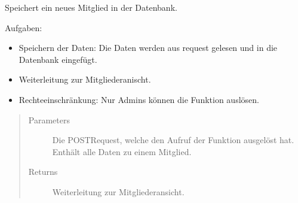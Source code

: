 \documentclass[letterpaper,10pt,english]{sphinxmanual}
\begin{document}
\begin{fulllineitems}
\label{\detokenize{masterCodeDoc:mitglieder.views.erstellen}}
Speichert ein neues Mitglied in der Datenbank.

Aufgaben:
\begin{itemize}
\item {} 
Speichern der Daten: Die Daten werden aus request gelesen und in die Datenbank eingefügt.

\item {} 
Weiterleitung zur Mitgliederanischt.

\item {} 
Rechteeinschränkung: Nur Admins können die Funktion auslösen.

\end{itemize}
\begin{quote}\begin{description}
\item[{Parameters}] \leavevmode
{} \textendash{} Die POST\sphinxhyphen{}Request, welche den Aufruf der Funktion ausgelöst hat. Enthält alle Daten zu einem Mitglied.

\item[{Returns}] \leavevmode
Weiterleitung zur Mitgliederansicht.

\end{description}\end{quote}

\end{fulllineitems}

\end{document}

